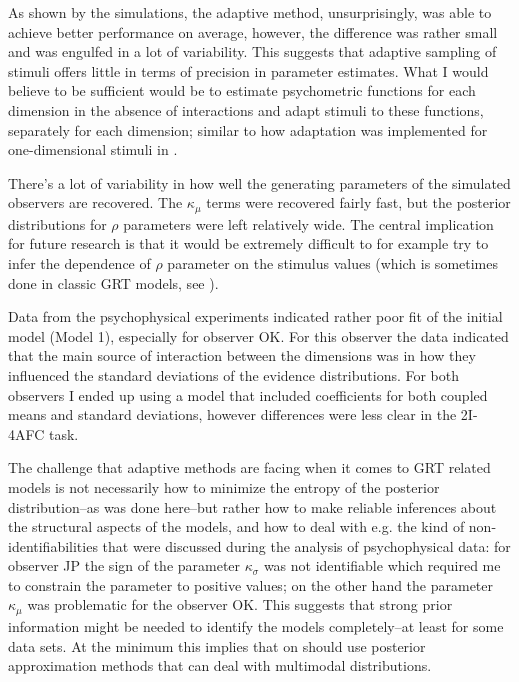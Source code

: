 \documentclass{article}\usepackage{knitr}
\begin{document}
As shown by  the simulations,  the adaptive method, unsurprisingly, was able to achieve better performance on average, however, the difference was rather small and was engulfed in a lot of variability. This suggests that adaptive sampling of stimuli offers little in terms of precision in parameter estimates. What I would believe to be sufficient would be to estimate psychometric functions for each dimension in the absence of interactions and adapt stimuli to these functions, separately for each dimension; similar to how adaptation was implemented for one-dimensional stimuli in \citet{kontsevichtyler1999}. 

There's a lot of variability in how well the generating parameters of the simulated observers are recovered. The $\kappa_{\mu}$ terms were recovered fairly fast, but the posterior distributions for $\rho$ parameters were left relatively wide. The central implication for future research is that it would be extremely difficult to for example try to infer the dependence of $\rho$ parameter on the stimulus values (which is sometimes done in classic GRT  models, see \citet{ashby2015, soto2017}). 
 
Data from the psychophysical experiments indicated rather poor fit of the initial model (Model 1), especially for observer OK. For this observer the data indicated that the main source of interaction between the dimensions was in how they influenced the standard deviations of the evidence distributions. For both observers I ended up using a model that included coefficients for both coupled means and standard deviations, however differences were less clear in the 2I-4AFC task.

The challenge that adaptive methods are facing when it comes to GRT related models is not necessarily how to minimize the entropy of the posterior distribution--as was done here--but rather how to make reliable inferences about the structural aspects of the models, and how to deal with e.g. the kind of non-identifiabilities that were discussed during the analysis of psychophysical data: for observer JP the sign of the parameter $\kappa_{\sigma}$ was not identifiable which required me to constrain the parameter to positive values; on the other hand the parameter $\kappa_{\mu}$ was problematic for the observer OK. This suggests that strong prior information might be needed to identify the models completely--at least for some data sets. At the minimum this implies that on should use posterior approximation methods that can deal with multimodal distributions. 
\end{document}
